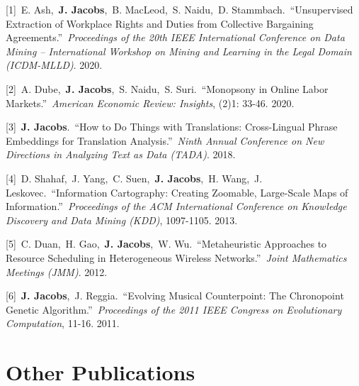 \documentclass[letterpaper,11pt]{article}
\begin{document}
[1]~E. Ash,~\textbf{J. Jacobs},~B. MacLeod,~S. Naidu,~D. Stammbach.~``Unsupervised Extraction of Workplace Rights and Duties from Collective Bargaining Agreements.''~\textit{Proceedings of the 20th IEEE International Conference on Data Mining -- International Workshop on Mining and Learning in the Legal Domain (ICDM-MLLD)}. 2020.\vspace{2mm}


[2]~A. Dube,~\textbf{J. Jacobs},~S. Naidu,~S. Suri.~``Monopsony in Online Labor Markets.''~\textit{American Economic Review: Insights}, (2)1: 33-46. 2020.\vspace{2mm}


[3]~\textbf{J. Jacobs}.~``How to Do Things with Translations: Cross-Lingual Phrase Embeddings for Translation Analysis.''~\textit{Ninth Annual Conference on New Directions in Analyzing Text as Data (TADA)}. 2018.\vspace{2mm}


[4]~D. Shahaf,~J. Yang,~C. Suen,~\textbf{J. Jacobs},~H. Wang,~J. Leskovec.~``Information Cartography: Creating Zoomable, Large-Scale Maps of Information.''~\textit{Proceedings of the ACM International Conference on Knowledge Discovery and Data Mining (KDD)}, 1097-1105. 2013.\vspace{2mm}


[5]~C. Duan,~H. Gao,~\textbf{J. Jacobs},~W. Wu.~``Metaheuristic Approaches to Resource Scheduling in Heterogeneous Wireless Networks.''~\textit{Joint Mathematics Meetings (JMM)}. 2012.\vspace{2mm}


[6]~\textbf{J. Jacobs},~J. Reggia.~``Evolving Musical Counterpoint: The Chronopoint Genetic Algorithm.''~\textit{Proceedings of the 2011 IEEE Congress on Evolutionary Computation}, 11-16. 2011.\vspace{2mm}





\section{Other Publications}
\end{document}
